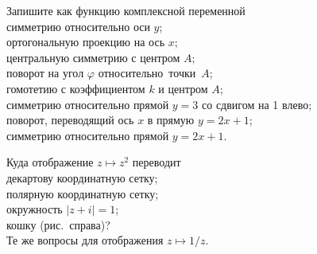 \documentclass[a4paper, 12pt]{article}
\begin{document}



{\hsize 13.2cm

Запишите %
как функцию комплексной переменной\\
 симме\-трию относительно оси $y$;\\
 ортогона\-ль\-ную проекцию на ось $x$;\\
 центральную симметрию с центром $A$;\\
 поворот на угол $\varphi$ относительно~точки~$A$;\\
 гомотетию с коэффициентом $k$ и центром $A$;\\
симметрию относительно прямой $y=3$ со сдвигом на 1 влево;\\
 поворот, %
переводящий ось $x$ в прямую $y=2x+1$;\\
 симметрию относительно прямой $y=2x+1$.\\





Куда отображение $z\longmapsto z^2$
переводит\\
декартову координатную сетку;\\
полярную координатную сетку;\\
окружность $|z+i|=1$;\\
кошку (рис.~справа)?\\
Те же вопросы для отображения
$z\longmapsto 1/z$.

}
\end{document}

